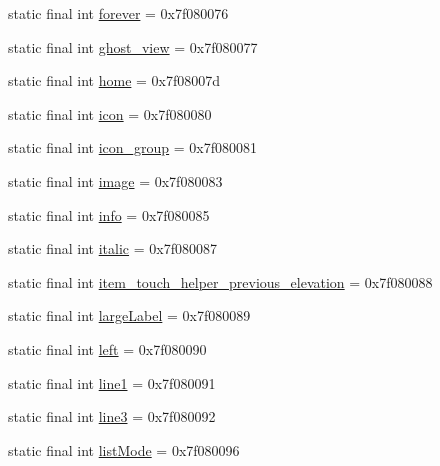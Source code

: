\begin{DoxyCompactItemize}
\item 
static final int \mbox{\hyperlink{classandroid_1_1support_1_1design_1_1_r_1_1id_a6ec90276f3cf057a0cabcd22b4b4eb6a}{forever}} = 0x7f080076
\item 
static final int \mbox{\hyperlink{classandroid_1_1support_1_1design_1_1_r_1_1id_a41295642e91c7262875f7914b5ce240e}{ghost\+\_\+view}} = 0x7f080077
\item 
static final int \mbox{\hyperlink{classandroid_1_1support_1_1design_1_1_r_1_1id_a848c27a28b62431c2fc8e4bb50cf204c}{home}} = 0x7f08007d
\item 
static final int \mbox{\hyperlink{classandroid_1_1support_1_1design_1_1_r_1_1id_a62494a5c59714ce0338e2e5c84665d65}{icon}} = 0x7f080080
\item 
static final int \mbox{\hyperlink{classandroid_1_1support_1_1design_1_1_r_1_1id_a19ea57e4b9ba2101c5f99dee6763cdd0}{icon\+\_\+group}} = 0x7f080081
\item 
static final int \mbox{\hyperlink{classandroid_1_1support_1_1design_1_1_r_1_1id_ae3ec7e2d3cf3a673e1479e9f39e25716}{image}} = 0x7f080083
\item 
static final int \mbox{\hyperlink{classandroid_1_1support_1_1design_1_1_r_1_1id_a835f9da94449c6b2e273b1da9a0bbd69}{info}} = 0x7f080085
\item 
static final int \mbox{\hyperlink{classandroid_1_1support_1_1design_1_1_r_1_1id_a3d66f561d244a5c64e8a7e8bc61a4e7a}{italic}} = 0x7f080087
\item 
static final int \mbox{\hyperlink{classandroid_1_1support_1_1design_1_1_r_1_1id_ace7c90a7a591a13a8cc5e969c821e08d}{item\+\_\+touch\+\_\+helper\+\_\+previous\+\_\+elevation}} = 0x7f080088
\item 
static final int \mbox{\hyperlink{classandroid_1_1support_1_1design_1_1_r_1_1id_afd366da5bef3835c481c8caeaae9f216}{large\+Label}} = 0x7f080089
\item 
static final int \mbox{\hyperlink{classandroid_1_1support_1_1design_1_1_r_1_1id_a81624ba2a9b9f8858709fbac6452ce42}{left}} = 0x7f080090
\item 
static final int \mbox{\hyperlink{classandroid_1_1support_1_1design_1_1_r_1_1id_a4ca979dfdfa159de3380dc7366d4475a}{line1}} = 0x7f080091
\item 
static final int \mbox{\hyperlink{classandroid_1_1support_1_1design_1_1_r_1_1id_adb2c99c7cb5b12eb153c76aca66ae2c2}{line3}} = 0x7f080092
\item 
static final int \mbox{\hyperlink{classandroid_1_1support_1_1design_1_1_r_1_1id_a7b5a48e1774d54084d1294b471209727}{list\+Mode}} = 0x7f080096

\end{DoxyCompactItemize}
